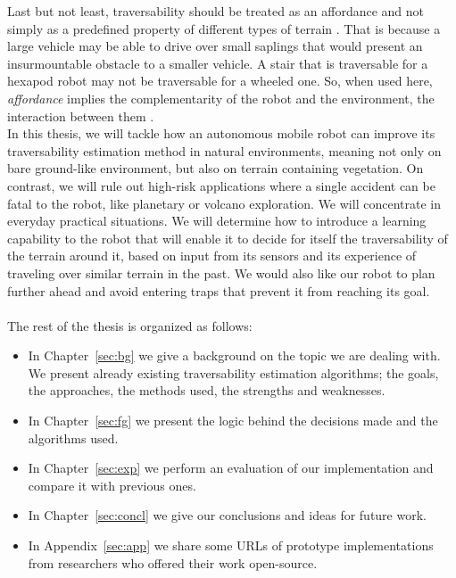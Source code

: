\documentclass[12pt,a4paper]{report}
\newcommand{\term}{\textit}
\newcommand{\acronym}{\MakeUppercase}
\begin{document}
	Last but not least, traversability should be treated as an affordance and 
	not simply as a predefined property of different types of terrain \citep{Kim}. 
	That is because a large vehicle may be able to drive over small saplings that 
	would present an insurmountable obstacle to a smaller vehicle. A stair that is 
	traversable for a hexapod robot may not be traversable for a wheeled one. So, 
	when used here, \term{affordance} implies the complementarity of the robot and 
	the environment, the interaction between them \citep{Ugur}.
	\\
	
	In this thesis, we will tackle how an autonomous mobile robot can improve its 
	traversability estimation method in natural environments, meaning not 
	only on bare ground-like environment, but also on terrain containing vegetation. 
	On contrast, we will rule out high-risk applications where a single accident can 
	be fatal to the robot, like planetary or volcano exploration. We will concentrate 
	in everyday practical situations. We will determine how to introduce a learning 
	capability to the robot that will enable it to decide for itself the 
	traversability of the terrain around it, based on input from its sensors 
	and its experience of traveling over similar terrain in the past. We would also 
	like our robot to plan further ahead and avoid entering traps that prevent it 
	from reaching its goal.
	\\\\
	
	The rest of the thesis is organized as follows:
	\begin{itemize}
		\item In Chapter~\ref{sec:bg} we give a background on the topic we are dealing 
		with. We present already existing traversability estimation algorithms; the 
		goals, the approaches, the methods used, the strengths and weaknesses. 
		\item In Chapter~\ref{sec:fg} we present the logic behind the decisions made 
		and the algorithms used.
		\item In Chapter~\ref{sec:exp} we perform an evaluation of our implementation 
		and compare it with previous ones.
		\item In Chapter~\ref{sec:concl} we give our conclusions and ideas for future 
		work.
		\item In Appendix~\ref{sec:app} we share some \acronym{url}s of prototype 
		implementations from researchers who offered their work open-source.
	\end{itemize}
	
\end{document}
